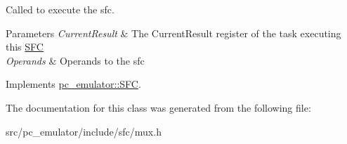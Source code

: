 Called to execute the sfc. 


\begin{DoxyParams}{Parameters}
{\em Current\+Result} & The Current\+Result register of the task executing this \hyperlink{classpc__emulator_1_1SFC}{S\+FC} \\
\hline
{\em Operands} & Operands to the sfc \\
\hline
\end{DoxyParams}


Implements \hyperlink{classpc__emulator_1_1SFC_ab206c80fc0e429c56672b4f6a0ca8635}{pc\+\_\+emulator\+::\+S\+FC}.



The documentation for this class was generated from the following file\+:\begin{DoxyCompactItemize}
\item 
src/pc\+\_\+emulator/include/sfc/mux.\+h\end{DoxyCompactItemize}

